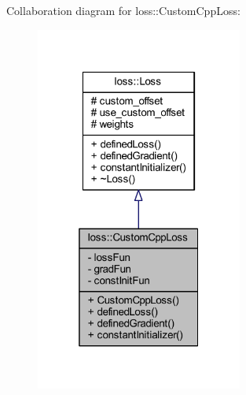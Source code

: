 Collaboration diagram for loss\+:\+:Custom\+Cpp\+Loss\+:\nopagebreak
\begin{figure}[H]
\begin{center}
\leavevmode
\includegraphics[width=193pt]{classloss_1_1_custom_cpp_loss__coll__graph}
\end{center}
\end{figure}

